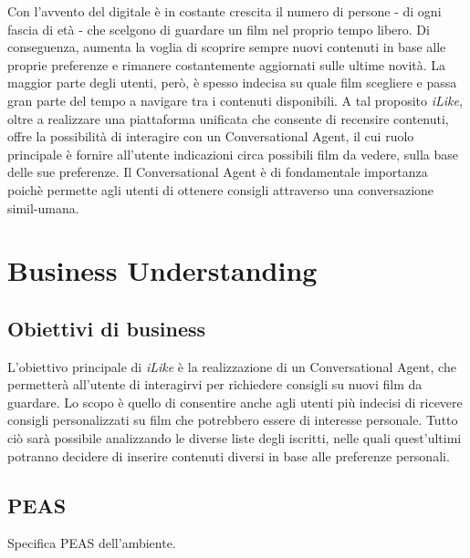 \documentclass[a4paper, 10pt]{report}
\begin{document}
        Con l'avvento del digitale è in costante crescita il numero di persone - di ogni fascia di età - che scelgono
        di guardare un film nel proprio tempo libero. Di conseguenza, aumenta la voglia di scoprire sempre nuovi contenuti
        in base alle proprie preferenze e rimanere costantemente aggiornati sulle ultime novità. La maggior parte degli utenti,
        però, è spesso indecisa su quale film scegliere e passa gran parte del tempo a navigare tra i contenuti disponibili.
        A tal proposito \textit{iLike}, oltre a realizzare una piattaforma unificata che consente di recensire contenuti, offre
        la possibilità di interagire con un Conversational Agent, il cui ruolo principale è fornire all'utente indicazioni circa possibili
        film da vedere, sulla base delle sue preferenze.
        Il Conversational Agent è di fondamentale importanza poichè permette agli utenti di ottenere consigli attraverso una
        conversazione simil-umana.


    \chapter{Business Understanding}\label{ch:business-understanding}

        \section{Obiettivi di business}\label{sec:obiettivi-di-business}

            L'obiettivo principale di \textit{iLike} è la realizzazione di un Conversational Agent, che permetterà all'utente di
            interagirvi per richiedere consigli su nuovi film da guardare. Lo scopo è quello di consentire anche agli utenti più indecisi
            di ricevere consigli personalizzati su film che potrebbero essere di interesse personale.
            Tutto ciò sarà possibile analizzando le diverse liste degli iscritti, nelle quali quest'ultimi potranno decidere di inserire contenuti
            diversi in base alle preferenze personali.

        \section{PEAS}\label{sec:peas}

            Specifica PEAS dell'ambiente.
\end{document}
